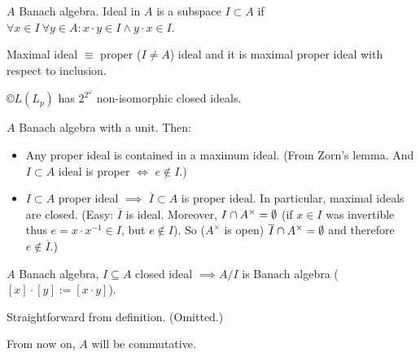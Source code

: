 \documentclass[12pt]{article}					%
\begin{document}
\begin{definice}
	$A$ Banach algebra. Ideal in $A$ is a subspace $I \subset A$ if $\forall x \in I\ \forall y \in A: x·y \in I \land y·x \in I$.

	Maximal ideal $≡$ proper ($I ≠ A$) ideal and it is maximal proper ideal with respect to inclusion.

	\begin{priklady}
		$©L(L_p)$ has $2^{2^\omega}$ non-isomorphic closed ideals.
	\end{priklady}
\end{definice}

\begin{tvrzeni}
	$A$ Banach algebra with a unit. Then:

	\begin{itemize}
		\item Any proper ideal is contained in a maximum ideal. (From Zorn's lemma. And $I \subset A$ ideal is proper $\Leftrightarrow$ $e \notin I$.)
		\item $I \subset A$ proper ideal $\implies$ $\overline{I} \subset A$ is proper ideal. In particular, maximal ideals are closed. (Easy: $\overline{I}$ is ideal. Moreover, $I \cap A^\times = \emptyset$ (if $x \in I$ was invertible thus $e = x·x^{-1} \in I$, but $e \notin I$). So ($A^\times$ is open) $\overline{I} \cap A^\times = \emptyset$ and therefore $e \notin \overline{I}$.)
	\end{itemize}
\end{tvrzeni}

\begin{tvrzeni}
	$A$ Banach algebra, $I \subseteq A$ closed ideal $\implies A / I$ is Banach algebra ($[x]·[y] := [x·y]$).

	\begin{dukazin}
		Straightforward from definition. (Omitted.)
	\end{dukazin}
\end{tvrzeni}

\begin{poznamka}
	From now on, $A$ will be commutative.
\end{poznamka}
\end{document}
